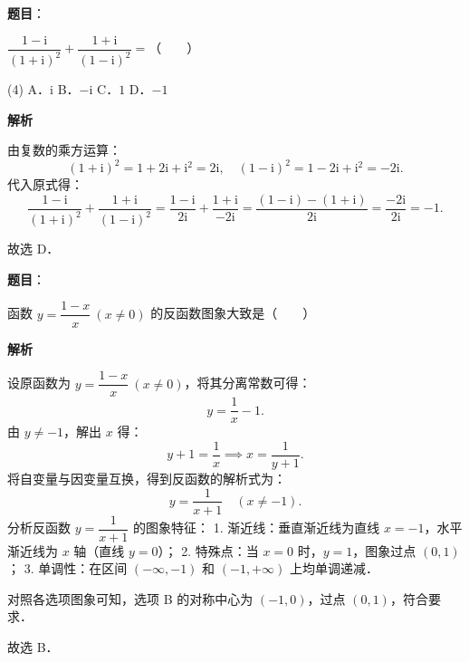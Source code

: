 
\begin{answer}

\textbf{题目}：

$\dfrac{1-\mathrm{i}}{(1+\mathrm{i})^2} + \dfrac{1+\mathrm{i}}{(1-\mathrm{i})^2} =$\mbox{（　　）}

\begin{gkopts}(4)
\task A．$\mathrm{i}$
\task B．$-\mathrm{i}$
\task C．$1$
\task D．$-1$
\end{gkopts}

\textbf{解析}

由复数的乘方运算：
\nopagebreak[4]
\[
(1+\mathrm{i})^2 = 1 + 2\mathrm{i} + \mathrm{i}^2 = 2\mathrm{i}, \quad (1-\mathrm{i})^2 = 1 - 2\mathrm{i} + \mathrm{i}^2 = -2\mathrm{i}.
\]
代入原式得：
\nopagebreak[4]
\[
\dfrac{1-\mathrm{i}}{(1+\mathrm{i})^2} + \dfrac{1+\mathrm{i}}{(1-\mathrm{i})^2} = \dfrac{1-\mathrm{i}}{2\mathrm{i}} + \dfrac{1+\mathrm{i}}{-2\mathrm{i}} = \dfrac{(1-\mathrm{i}) - (1+\mathrm{i})}{2\mathrm{i}} = \dfrac{-2\mathrm{i}}{2\mathrm{i}} = -1.
\]

故选 D．


\end{answer}
\begin{answer}

\textbf{题目}：

函数 $y = \dfrac{1-x}{x}\ (x \neq 0)$ 的反函数图象大致是\mbox{（　　）}
\nopagebreak[4]
\begin{center}\end{center}
\nopagebreak[4]
\textbf{解析}

设原函数为 $y = \dfrac{1-x}{x}\ (x \neq 0)$，将其分离常数可得：
\nopagebreak[4]
\[
y = \dfrac{1}{x} - 1.
\]
由 $y \neq -1$，解出 $x$ 得：
\nopagebreak[4]
\[
y + 1 = \dfrac{1}{x} \implies x = \dfrac{1}{y+1}.
\]
将自变量与因变量互换，得到反函数的解析式为：
\nopagebreak[4]
\[
y = \dfrac{1}{x+1} \quad (x \neq -1).
\]
分析反函数 $y = \dfrac{1}{x+1}$ 的图象特征：
1. 渐近线：垂直渐近线为直线 $x = -1$，水平渐近线为 $x$ 轴（直线 $y = 0$）；
2. 特殊点：当 $x = 0$ 时，$y = 1$，图象过点 $(0, 1)$；
3. 单调性：在区间 $(-\infty, -1)$ 和 $(-1, +\infty)$ 上均单调递减．

对照各选项图象可知，选项 B 的对称中心为 $(-1, 0)$，过点 $(0, 1)$，符合要求．

故选 B．


\end{answer}
